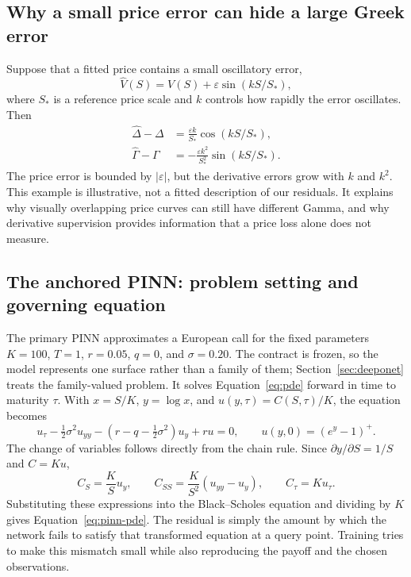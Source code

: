 \documentclass[11pt,a4paper]{article}
\begin{document}
\subsection{Why a small price error can hide a large Greek error}
Suppose that a fitted price contains a small oscillatory error,
\begin{equation}
\widehat V(S)=V(S)+\varepsilon\sin(kS/S_*),
\end{equation}
where $S_*$ is a reference price scale and $k$ controls how rapidly the error oscillates. Then
\begin{align}
\widehat\Delta-\Delta&=\frac{\varepsilon k}{S_*}\cos(kS/S_*),\\
\widehat\Gamma-\Gamma&=-\frac{\varepsilon k^2}{S_*^2}\sin(kS/S_*).
\end{align}
The price error is bounded by $|\varepsilon|$, but the derivative errors grow with $k$ and $k^2$. This example is illustrative, not a fitted description of our residuals. It explains why visually overlapping price curves can still have different Gamma, and why derivative supervision provides information that a price loss alone does not measure.

\subsection{The anchored PINN: problem setting and governing equation}
\label{sec:pinn-theory}

The primary PINN approximates a European call for the fixed parameters $K=100$, $T=1$, $r=0.05$, $q=0$, and $\sigma=0.20$. The contract is frozen, so the model represents one surface rather than a family of them; Section~\ref{sec:deeponet} treats the family-valued problem. It solves Equation~\eqref{eq:pde} forward in time to maturity $\tau$. With $x=S/K$, $y=\log x$, and $u(y,\tau)=C(S,\tau)/K$, the equation becomes
\begin{equation}
u_\tau-\tfrac12\sigma^2u_{yy}-(r-q-\tfrac12\sigma^2)u_y+ru=0,
\qquad u(y,0)=(e^y-1)^+ . \label{eq:pinn-pde}
\end{equation}
The change of variables follows directly from the chain rule. Since $\partial y/\partial S=1/S$ and $C=Ku$,
\begin{equation}
C_S=\frac{K}{S}u_y,\qquad
C_{SS}=\frac{K}{S^2}(u_{yy}-u_y),\qquad C_\tau=Ku_\tau.
\end{equation}
Substituting these expressions into the Black--Scholes equation and dividing by $K$ gives Equation~\eqref{eq:pinn-pde}. The residual is simply the amount by which the network fails to satisfy that transformed equation at a query point. Training tries to make this mismatch small while also reproducing the payoff and the chosen observations.
\end{document}
